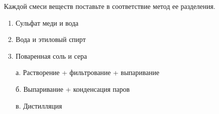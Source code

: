 
Каждой смеси веществ поставьте в соответствие метод ее разделения.

        \begin{enumerate}
            \item Сульфат меди и вода
            \item Вода и этиловый спирт
            \item Поваренная соль и сера
        \end{enumerate}
        
        \begin{enumerate}
            \item[а.] Растворение + фильтрование + выпаривание
            \item[б.] Выпаривание + конденсация паров
            \item[в.] Дистилляция
        \end{enumerate}



